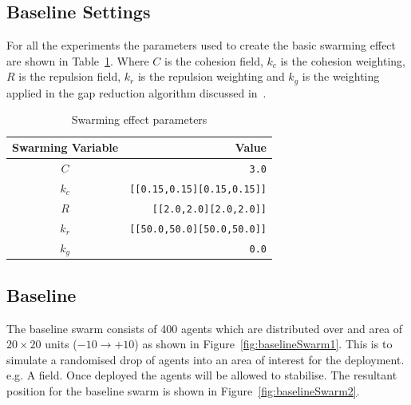 \documentclass[12pt,a4paper]{IEEEtran}
\newcommand{\kc}{\mathit{k_c}}
\newcommand{\kr}{\mathit{k_r}}
\newcommand{\kg}{\mathit{k_g}}
\newcommand{\rb}{\mathit{R}}
\begin{document}
\subsection{Baseline Settings}
For all the experiments the parameters used to create the basic swarming effect are shown in Table~\ref{tab:swarmingEffect}. Where $C$ is the cohesion field, $\kc$ is the cohesion weighting, $\rb$ is the repulsion field, $\kr$ is the repulsion weighting and $\kg$ is the weighting applied in the gap reduction algorithm discussed in~\cite{eliot2019void}. 

\begin{table}[H]
	\centering
	\tiny
	\begin{tabular}{|c|r|}
		\hline
		\rowcolor[HTML]{000000} 
		{\color[HTML]{FFFFFF} Swarming Variable} & {\color[HTML]{FFFFFF} Value} \\ \hline
		$C$ & \texttt{3.0} \\ \hline
		$k_c$ & \texttt{[[0.15,0.15][0.15,0.15]]}  \\ \hline
		$R$ & \texttt{[[2.0,2.0][2.0,2.0]]} \\ \hline
		$k_r$ & \texttt{[[50.0,50.0][50.0,50.0]]} \\ \hline
		$k_g$ & \texttt{0.0} \\ \hline
	\end{tabular}
	\caption{Swarming effect parameters}
	\label{tab:swarmingEffect}
\end{table}

\subsection{Baseline}
The baseline swarm consists of 400 agents which are distributed over and area of $20\times 20$ units ($-10\rightarrow+10$) as shown in Figure~\ref{fig:baselineSwarm1}. This is to simulate a randomised drop of agents into an area of interest for the deployment. e.g. A field. Once deployed the agents will be allowed to stabilise. The resultant position for the baseline swarm is shown in Figure~\ref{fig:baselineSwarm2}. 
\end{document}
